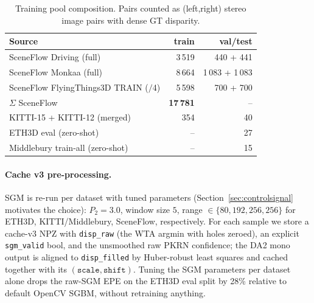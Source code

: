\documentclass[journal]{IEEEtran}
\begin{document}
\begin{table}[tb]
\centering
\caption{Training pool composition. Pairs counted as (left,right) stereo image pairs with dense GT disparity.}
\label{tab:training_pool}
\small
\begin{tabular}{lrr}
\toprule
Source & train & val/test \\
\midrule
SceneFlow Driving (full) & 3\,519 & 440 + 441 \\
SceneFlow Monkaa (full) & 8\,664 & 1\,083 + 1\,083 \\
SceneFlow FlyingThings3D TRAIN ($/$4) & 5\,598 & 700 + 700 \\
\hspace{1em}$\Sigma$ SceneFlow & \textbf{17\,781} & -- \\
KITTI-15 + KITTI-12 (merged) & 354 & 40 \\
\midrule
ETH3D eval (zero-shot) & -- & 27 \\
Middlebury train-all (zero-shot) & -- & 15 \\
\bottomrule
\end{tabular}
\end{table}

\paragraph{Cache v3 pre-processing.} SGM is re-run per dataset with tuned parameters (Section~\ref{sec:controlsignal} motivates the choice): $P_2\!=\!3.0$, window size $5$, range $\in\{80, 192, 256, 256\}$ for ETH3D, KITTI/Middlebury, SceneFlow, respectively. For each sample we store a cache-v3 NPZ with \texttt{disp\_raw} (the WTA argmin with holes zeroed), an explicit \texttt{sgm\_valid} bool, and the unsmoothed raw PKRN confidence; the DA2 mono output is aligned to \texttt{disp\_filled} by Huber-robust least squares and cached together with its $(\texttt{scale}, \texttt{shift})$. Tuning the SGM parameters per dataset alone drops the raw-SGM EPE on the ETH3D eval split by 28\% relative to default OpenCV SGBM, without retraining anything.
\end{document}
